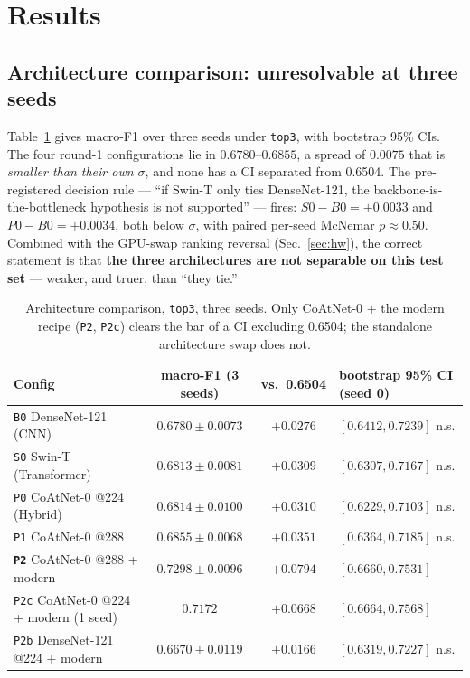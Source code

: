 \documentclass[11pt,a4paper]{article}
\newcommand{\macroF}{\textup{macro-F1}}   %
\begin{document}
\section{Results}
\label{sec:results}

\subsection{Architecture comparison: unresolvable at three seeds}
\label{sec:archcmp}
Table~\ref{tab:arch} gives \macroF{} over three seeds under \texttt{top3}, with
bootstrap 95\% CIs. The four round-1 configurations lie in $0.6780$--$0.6855$, a
spread of $0.0075$ that is \emph{smaller than their own $\sigma$}, and none has
a CI separated from 0.6504. The pre-registered decision rule --- ``if Swin-T
only ties DenseNet-121, the backbone-is-the-bottleneck hypothesis is not
supported'' --- fires: $S0-B0=+0.0033$ and $P0-B0=+0.0034$, both below $\sigma$,
with paired per-seed McNemar $p\approx0.50$. Combined with the GPU-swap ranking
reversal (Sec.~\ref{sec:hw}), the correct statement is that \textbf{the three
architectures are not separable on this test set} --- weaker, and truer, than
``they tie.''

\begin{table}[t]
\centering
\caption{Architecture comparison, \texttt{top3}, three seeds. Only
CoAtNet-0 + the modern recipe (\texttt{P2}, \texttt{P2c}) clears the bar of a CI
excluding 0.6504; the standalone architecture swap does not.}
\label{tab:arch}
\setlength{\tabcolsep}{4pt}
\begin{tabular}{l c c l}
\toprule
Config & \macroF{} (3 seeds) & vs.\ 0.6504 & bootstrap 95\% CI (seed 0) \\
\midrule
\texttt{B0} DenseNet-121 (CNN)      & $0.6780\pm0.0073$ & $+0.0276$ & $[0.6412,0.7239]$ n.s. \\
\texttt{S0} Swin-T (Transformer)    & $0.6813\pm0.0081$ & $+0.0309$ & $[0.6307,0.7167]$ n.s. \\
\texttt{P0} CoAtNet-0 @224 (Hybrid) & $0.6814\pm0.0100$ & $+0.0310$ & $[0.6229,0.7103]$ n.s. \\
\texttt{P1} CoAtNet-0 @288          & $0.6855\pm0.0068$ & $+0.0351$ & $[0.6364,0.7185]$ n.s. \\
\midrule
\textbf{\texttt{P2}} CoAtNet-0 @288 + modern & $\mathbf{0.7298\pm0.0096}$ & $\mathbf{+0.0794}$ & $\mathbf{[0.6660,0.7531]}$ \\
\texttt{P2c} CoAtNet-0 @224 + modern (1 seed) & $0.7172$ & $+0.0668$ & $[0.6664,0.7568]$ \\
\texttt{P2b} DenseNet-121 @224 + modern & $0.6670\pm0.0119$ & $+0.0166$ & $[0.6319,0.7227]$ n.s. \\
\bottomrule
\end{tabular}
\end{table}
\end{document}
